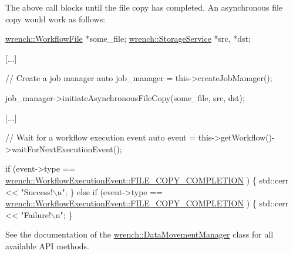 The above call blocks until the file copy has completed. An asynchronous file copy would work as follows\+:


\begin{DoxyCode}
\hyperlink{classwrench_1_1_workflow_file}{wrench::WorkflowFile} *some\_file;
\hyperlink{classwrench_1_1_storage_service}{wrench::StorageService} *src, *dst;

[...]

\textcolor{comment}{// Create a job manager}
\textcolor{keyword}{auto} job\_manager = this->createJobManager();

job\_manager->initiateAsynchronousFileCopy(some\_file, src, dst);

[...]

\textcolor{comment}{// Wait for a workflow execution event}
\textcolor{keyword}{auto} \textcolor{keyword}{event} = this->getWorkflow()->waitForNextExecutionEvent();

\textcolor{keywordflow}{if} (event->type == \hyperlink{classwrench_1_1_workflow_execution_event_a5611165191fbc4d121d1b141c748a448a01537cae4bfcc4d44d2746cd9a3f303f}{wrench::WorkflowExecutionEvent::FILE\_COPY\_COMPLETION}
      ) \{
  std::cerr << \textcolor{stringliteral}{"Success!\(\backslash\)n"};
\} \textcolor{keywordflow}{else} \textcolor{keywordflow}{if} (event->type == \hyperlink{classwrench_1_1_workflow_execution_event_a5611165191fbc4d121d1b141c748a448a01537cae4bfcc4d44d2746cd9a3f303f}{wrench::WorkflowExecutionEvent::FILE\_COPY\_COMPLETION}
      ) \{
  std::cerr << \textcolor{stringliteral}{"Failure!\(\backslash\)n"};
\}
\end{DoxyCode}


See the documentation of the {\ttfamily \hyperlink{classwrench_1_1_data_movement_manager}{wrench\+::\+Data\+Movement\+Manager}} class for all available A\+PI methods. 